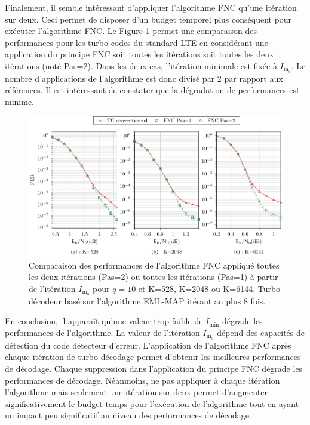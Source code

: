 Finalement, il semble intéressant d'appliquer l'algorithme FNC qu'une itération sur deux. Ceci permet de disposer d'un budget temporel plus conséquent pour exécuter l'algorithme FNC. Le Figure 
\ref{fig:fnc_step} permet une comparaison des performances pour les turbo codes du standard LTE en considérant une application du principe FNC soit toutes les itérations 
soit toutes les deux itérations (noté Pas=2). Dans les deux cas, l'itération minimale est fixée à $I_{\text{m}_\text{o}}$. Le nombre d'applications de l'algorithme est donc divisé par 2 par rapport aux références. Il est intéressant de constater  que la dégradation de performances est minime.

\begin{figure}[!t]
	\centering
	\hspace*{-.1\textwidth}
	\includegraphics[width=1.1\textwidth]{main/ch4_fig/final/tikz_last/fnc10_minO_s2.pdf}
	\caption{Comparaison des performances de l'algorithme FNC appliqué toutes les deux itérations (Pas=2) ou toutes
	les itérations (Pas=1) à partir de l'itération $I_{\text{m}_\text{o}}$ pour $q=10$ et K=528,
	K=2048 ou K=6144.
	Turbo décodeur basé sur l'algorithme EML-MAP itérant au plus 8 fois.
	\label{fig:fnc_step}}
	\vspace*{-1em}
\end{figure}

En conclusion, il apparaît qu'une valeur trop faible de $I_\text{min}$ dégrade les performances de l'algorithme. 
La valeur de l'itération $I_{\text{m}_\text{o}}$ dépend des
capacités de détection du code détecteur d'erreur. L'application de l'algorithme FNC après chaque itération de turbo 
décodage permet d'obtenir les meilleures performances de décodage. Chaque suppression dans l'application du principe FNC 
dégrade les performances de décodage. Néanmoins, ne pas appliquer à chaque itération l'algorithme mais seulement une 
itération sur deux permet d'augmenter significativement le budget temps pour l'exécution de l'algorithme tout en ayant 
un impact peu significatif au niveau des performances de décodage. 

